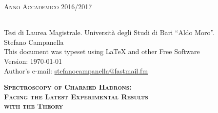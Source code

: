 \null
\vfill


{\large \textsc{Anno Accademico 2016/2017} }

\endgroup


\clearpage

\thispagestyle{empty}

\vspace*{\fill}

{\small
{} \\
Tesi di Laurea Magistrale. Università degli Studi di Bari ``Aldo Moro''. \\
Stefano Campanella \\
This document was typeset using \LaTeX{} and other Free Software \\
Version: \today \\
Author's e-mail: \url{stefanocampanella@fastmail.fm}
}

\newpage
\tableofcontents* \newpage

\thispagestyle{empty}

\begin{center}
{\LARGE
  \textsc{ \bfseries Spectroscopy of Charmed Hadrons:\\ Facing the Latest Experimental Results \\ with the Theory} \par
}
\HRule
\end{center}
\cleardoublepage

